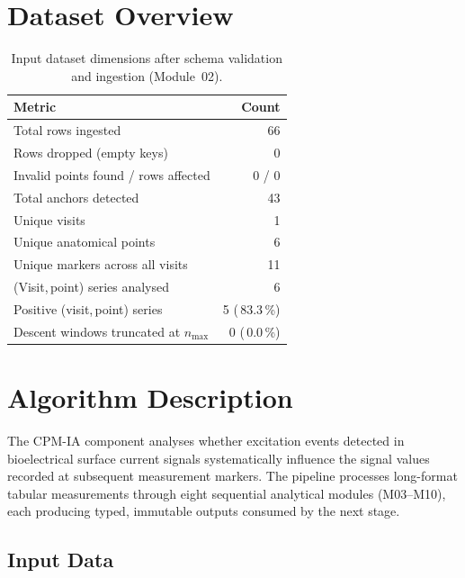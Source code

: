 \documentclass[a4paper,11pt]{article}
\begin{document}
\section{Dataset Overview}

\begin{table}[h!]
\centering
\small
\caption{Input dataset dimensions after schema validation and ingestion (Module~02).}
\begin{tabular}{lr}
\toprule
\textbf{Metric} & \textbf{Count} \\
\midrule
Total rows ingested                        & 66 \\
Rows dropped (empty keys)                  & 0 \\
Invalid points found / rows affected       & 0 / 0 \\
Total anchors detected                     & 43 \\
Unique visits                          & 1 \\
Unique anatomical points               & 6 \\
Unique markers across all visits       & 11 \\
(Visit,\,point) series analysed        & 6 \\
Positive (visit,\,point) series        & 5 (\,83.3\,\%) \\
Descent windows truncated at $n_{\max}$ & 0 (\,0.0\,\%) \\
\bottomrule
\end{tabular}
\end{table}

\section{Algorithm Description}

The CPM-IA component analyses whether excitation events detected in bioelectrical surface
current signals systematically influence the signal values recorded at subsequent measurement
markers. The pipeline processes long-format tabular measurements through eight sequential
analytical modules (M03--M10), each producing typed, immutable outputs consumed by the next
stage.

\subsection{Input Data}
\end{document}
